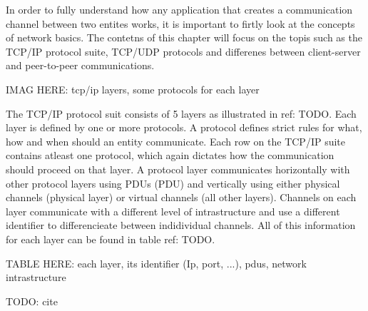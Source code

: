In order to fully understand how any application that creates a communication channel between two entites works, it is important to firtly look at the concepts of network basics. The contetns of this chapter will focus on the topis such as the TCP/IP protocol suite, TCP/UDP protocols and differenes between client-server and peer-to-peer communications.

IMAG HERE: tcp/ip layers, some protocols for each layer

The TCP/IP protocol suit consists of 5 layers as illustrated in ref: TODO. Each layer is defined by one or more protocols. A protocol defines strict rules for what, how and when should an entity communicate. Each row on the TCP/IP suite contains atleast one protocol, which again dictates how the communication should proceed on that layer. A protocol layer communicates horizontally with other protocol layers using PDUs (\acl{PDU}) and vertically using either physical channels (physical layer) or virtual channels (all other layers). Channels on each layer communicate with a different level of intrastructure and use a different identifier to differencieate between indidividual channels. All of this information for each layer can be found in table ref: TODO.

TABLE HERE: each layer, its identifier (Ip, port, ...), pdus, network intrastructure



TODO: cite
